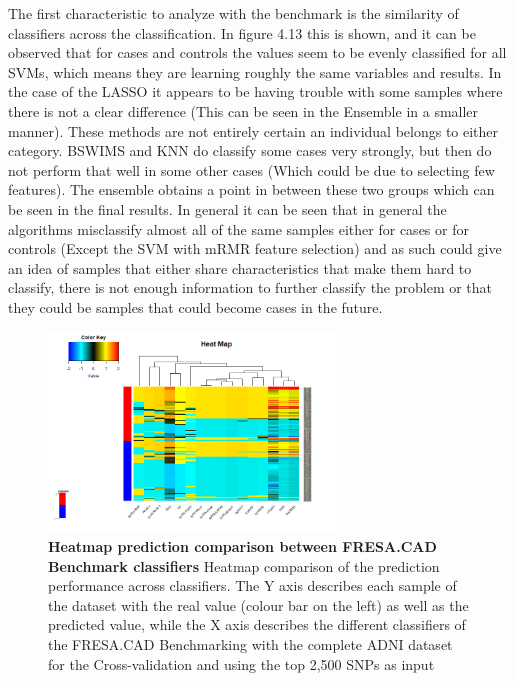 The first characteristic to analyze with the benchmark is the similarity of classifiers across the classification. In figure 4.13 this is shown, and it can be observed that for cases and controls the values seem to be evenly classified for all SVMs, which means they are learning roughly the same variables and results. In the case of the LASSO it appears to be having trouble with some samples where there is not a clear difference (This can be seen in the Ensemble in a smaller manner). These methods are not entirely certain an individual belongs to either category. BSWIMS and KNN do classify some cases very strongly, but then do not perform that well in some other cases (Which could be due to selecting few features). The ensemble obtains a point in between these two groups which can be seen in the final results. In general it can be seen that in general the algorithms misclassify almost all of the same samples either for cases or for controls (Except the SVM with mRMR feature selection) and as such could give an idea of samples that either share characteristics that make them hard to classify, there is not enough information to further classify the problem or that they could be samples that could become cases in the future.
 
 \begin{figure}[!ht]
\centerline{\includegraphics[width=3in]{images/results/fresaHM.png}}
\caption{{\bf Heatmap prediction comparison between FRESA.CAD Benchmark classifiers} 
Heatmap comparison of the prediction performance across classifiers. The Y axis describes each sample of the dataset with the real value (colour bar on the left) as well as the predicted value, while the X axis describes the different classifiers of the FRESA.CAD Benchmarking with the complete ADNI dataset for the Cross-validation and using the top 2,500 SNPs as input}
\label{fig15}
\end{figure}



